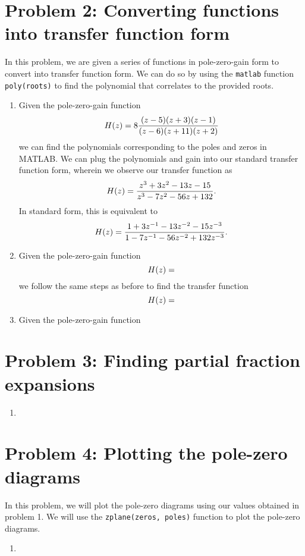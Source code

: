 \documentclass[11pt]{article}
\begin{document}
\section{Problem 2: Converting functions into transfer function form}
In this problem, we are given a series of functions in pole-zero-gain form
to convert into transfer function form. We can do so by using the \texttt{matlab} function
\texttt{poly(roots)} to find the polynomial that correlates to the provided roots.
\begin{enumerate}[label=\textbf{\alph*)}, leftmargin=2.6em]
    \item Given the pole-zero-gain function
    \begin{equation} \notag
        H(z) = 8 \frac{(z-5)(z+3)(z-1)}{(z-6)(z+11)(z+2)}
    \end{equation}
    we can find the polynomials corresponding to the poles and zeros in MATLAB. We 
    can plug the polynomials and gain into our standard transfer function form, wherein we observe
    our transfer function as
    \begin{equation} \notag
        H(z) = \frac{z^3+3z^2-13z-15}{z^3-7z^2-56z+132}.
    \end{equation}
    In standard form, this is equivalent to
    \begin{equation} \notag
        H(z) = \frac{1+3z^{-1}-13z^{-2}-15z^{-3}}{1-7z^{-1}-56z^{-2}+132z^{-3}}.
    \end{equation}

    \item Given the pole-zero-gain function
    \begin{equation} \notag
        H(z) = 
    \end{equation}
    we follow the same steps as before to find the transfer function
    \begin{equation} \notag
        H(z) = 
    \end{equation}

    \item Given the pole-zero-gain function
\end{enumerate}


\section{Problem 3: Finding partial fraction expansions}
\begin{enumerate}[label=\textbf{\alph*)}, leftmargin=2.6em]
    \item 
\end{enumerate}


\section{Problem 4: Plotting the pole-zero diagrams}
In this problem, we will plot the pole-zero diagrams using our values obtained in problem 1.
We will use the \texttt{zplane(zeros, poles)} function to plot the pole-zero diagrams.
\begin{enumerate}[label=\textbf{\alph*)}, leftmargin=2.6em]
    \item 
\end{enumerate}
\end{document}
